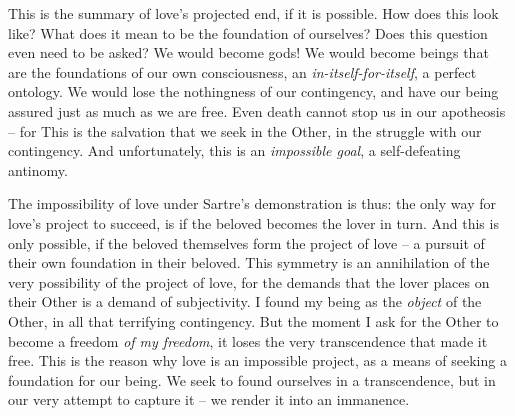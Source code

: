 This is the summary of love's projected end, if it is possible.  How does this look like? What does it mean to be the foundation of ourselves? Does this question even need to be asked? We would become gods! We would become beings that are the foundations of our own consciousness, an \emph{in-itself-for-itself}, a perfect ontology.  We would lose the nothingness of our contingency, and have our being assured just as much as we are free. Even death cannot stop us in our apotheosis -- for  This is the salvation that we seek in the Other, in the struggle with our contingency. And unfortunately, this is an \emph{impossible goal}, a self-defeating antinomy.

The impossibility of love under Sartre's demonstration is thus: the only way for love's project to succeed, is if the beloved becomes the lover in turn. And this is only possible, if the beloved themselves form the project of love -- a pursuit of their own foundation in their beloved. This symmetry is an annihilation of the very possibility of the project of love, for the demands that the lover places on their Other is a demand of subjectivity. I found my being as the \emph{object} of the Other, in all that terrifying contingency. But the moment I ask for the Other to become a freedom \emph{of my freedom}, it loses the very transcendence that made it free.  This is the reason why love is an impossible project, as a means of seeking a foundation for our being. We seek to found ourselves in a transcendence, but in our very attempt to capture it -- we render it into an immanence. 

